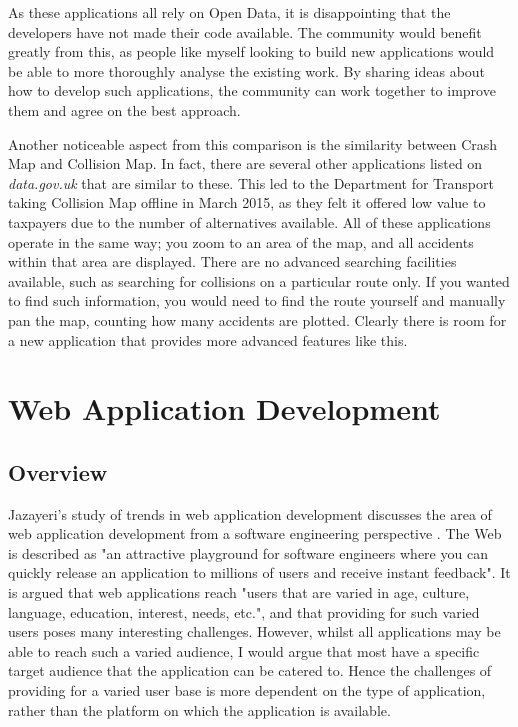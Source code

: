 \documentclass[authoryearcitations]{UoYCSproject}
\begin{document}
As these applications all rely on Open Data, it is disappointing that the developers have not made their code available. The community would benefit greatly from this, as people like myself looking to build new applications would be able to more thoroughly analyse the existing work. By sharing ideas about how to develop such applications, the community can work together to improve them and agree on the best approach.

Another noticeable aspect from this comparison is the similarity between Crash Map and Collision Map. In fact, there are several other applications listed on \textit{data.gov.uk} that are similar to these. This led to the Department for Transport taking Collision Map offline in March 2015, as they felt it offered low value to taxpayers due to the number of alternatives available.  All of these applications operate in the same way; you zoom to an area of the map, and all accidents within that area are displayed. There are no advanced searching facilities available, such as searching for collisions on a particular route only. If you wanted to find such information, you would need to find the route yourself and manually pan the map, counting how many accidents are plotted. Clearly there is room for a new application that provides more advanced features like this.  


\section{Web Application Development}

\subsection{Overview}

Jazayeri's study of trends in web application development discusses the area of web application development from a software engineering perspective \citep{Jazayeri2007}. The Web is described as "an attractive playground for software engineers where you can quickly release an application to millions of users and receive instant feedback". It is argued that web applications reach "users that are varied in age, culture, language, education, interest, needs, etc.", and that providing for such varied users poses many interesting challenges. However, whilst all applications may be able to reach such a varied audience, I would argue that most have a specific target audience that the application can be catered to. Hence the challenges of providing for a varied user base is more dependent on the type of application, rather than the platform on which the application is available. 
\end{document}
